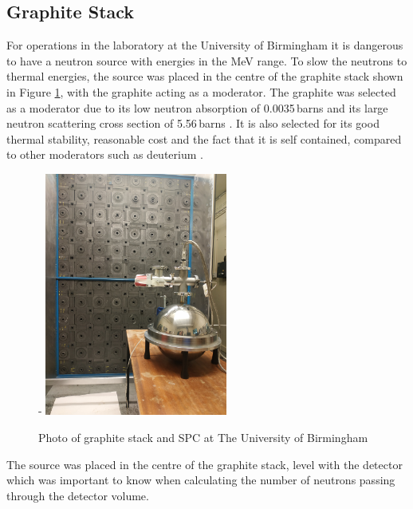 \documentclass[a4paper]{article}
\begin{document}
\subsection{Graphite Stack}
For operations in the laboratory at the University of Birmingham it is dangerous to have a neutron source with energies in the MeV range. To slow the neutrons to thermal energies, the source was placed in the centre of the graphite stack shown in Figure \ref{fig:stack}, with the graphite acting as a moderator. The graphite was selected as a moderator due to its low neutron absorption of 0.0035\,barns and its large neutron scattering cross section of 5.56\,barns \cite{taylor_francis_1992}. It is also selected for its good thermal stability, reasonable cost and the fact that it is self contained, compared to other moderators such as deuterium \cite{osti_4844185}.
\begin{figure}[H]-
    \centering
    \includegraphics[height=8cm]{plots/stack.jpg}
    \caption{Photo of graphite stack and SPC at The University of Birmingham \cite{ion}}
    \label{fig:stack}
\end{figure}
\noindent The source was placed in the centre of the graphite stack, level with the detector which was  important to know when calculating the number of neutrons passing through the detector volume.
\end{document}
